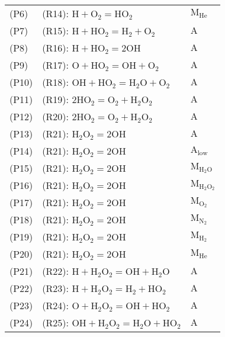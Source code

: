 \documentclass[preprint,3p,times,twocolumn]{elsarticle}
\begin{document}
\begin{itemize}
\begin{table}[htp]
\begin{tabular}{l l l}
(P6)& (R14): $ \mathrm{H} + \mathrm{O}_2 = \mathrm{HO}_2     $&$ \mathrm{M}_{\mathrm{He}}$\\
(P7)& (R15): $ \mathrm{H} + \mathrm{HO}_2 = \mathrm{H}_2 + \mathrm{O}_2     $&$ \mathrm{A}$\\
(P8)& (R16): $ \mathrm{H} + \mathrm{HO}_2 = 2\mathrm{OH}     $&$ \mathrm{A}$\\
(P9)& (R17): $ \mathrm{O} + \mathrm{HO}_2 = \mathrm{OH} + \mathrm{O}_2     $&$ \mathrm{A}$\\
(P10)& (R18): $ \mathrm{OH} + \mathrm{HO}_2 = \mathrm{H}_2\mathrm{O} + \mathrm{O}_2     $&$ \mathrm{A}$\\
(P11)& (R19): $ 2\mathrm{HO}_2 = \mathrm{O}_2 + \mathrm{H}_2\mathrm{O}_2     $&$ \mathrm{A}$\\
(P12)& (R20): $ 2\mathrm{HO}_2 = \mathrm{O}_2 + \mathrm{H}_2\mathrm{O}_2     $&$ \mathrm{A}$\\
(P13)& (R21): $ \mathrm{H}_2\mathrm{O}_2 = 2\mathrm{OH}     $&$ \mathrm{A}$\\
(P14)& (R21): $ \mathrm{H}_2\mathrm{O}_2 = 2\mathrm{OH}     $&$ \mathrm{A}_\mathrm{low}$\\
(P15)& (R21): $ \mathrm{H}_2\mathrm{O}_2 = 2\mathrm{OH}     $&$ \mathrm{M}_{\mathrm{H}_2\mathrm{O}}$\\
(P16)& (R21): $ \mathrm{H}_2\mathrm{O}_2 = 2\mathrm{OH}     $&$ \mathrm{M}_{\mathrm{H}_2\mathrm{O}_2}$\\
(P17)& (R21): $ \mathrm{H}_2\mathrm{O}_2 = 2\mathrm{OH}     $&$ \mathrm{M}_{\mathrm{O}_2}$\\
(P18)& (R21): $ \mathrm{H}_2\mathrm{O}_2 = 2\mathrm{OH}     $&$ \mathrm{M}_{\mathrm{N}_2}$\\
(P19)& (R21): $ \mathrm{H}_2\mathrm{O}_2 = 2\mathrm{OH}     $&$ \mathrm{M}_{\mathrm{H}_2}$\\
(P20)& (R21): $ \mathrm{H}_2\mathrm{O}_2 = 2\mathrm{OH}     $&$ \mathrm{M}_{\mathrm{He}}$\\
(P21)& (R22): $ \mathrm{H} + \mathrm{H}_2\mathrm{O}_2 = \mathrm{OH} + \mathrm{H}_2\mathrm{O}     $&$ \mathrm{A}$\\
(P22)& (R23): $ \mathrm{H} + \mathrm{H}_2\mathrm{O}_2 = \mathrm{H}_2 + \mathrm{HO}_2     $&$ \mathrm{A}$\\
(P23)& (R24): $ \mathrm{O} + \mathrm{H}_2\mathrm{O}_2 = \mathrm{OH} + \mathrm{HO}_2     $&$ \mathrm{A}$\\
(P24)& (R25): $ \mathrm{OH} + \mathrm{H}_2\mathrm{O}_2 = \mathrm{H}_2\mathrm{O} + \mathrm{HO}_2     $&$ \mathrm{A}$\\

\end{tabular}
\end{table}
\end{itemize}
\end{document}
